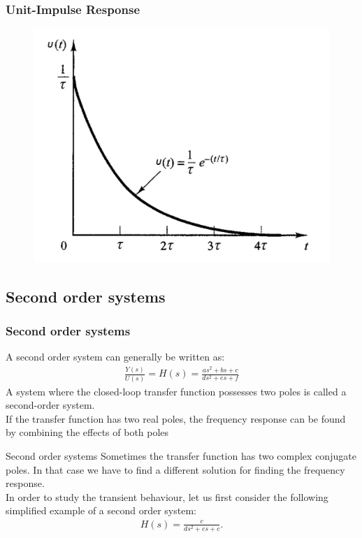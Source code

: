 \begin{frame}
\frametitle{Unit-Impulse Response}
	\begin{center}
		\begin{figure}
			\includegraphics[width=0.7\linewidth]{Afbeelding5}
		\end{figure}
	\end{center}
\end{frame}

\subsection{Second order systems} 

\begin{frame}
\frametitle{Second order systems}
A second order system can generally be written as:
\begin{align*}
\frac{Y(s)}{U(s)}=H(s)=\frac{as^2+ bs+ c}{ds^2+ es+ f}
\end{align*}
A system where the closed-loop transfer function possesses two poles is called a second-order system.\\
\vspace{1em}
If the transfer function has two real poles, the frequency response can be found by combining the effects of both poles
\end{frame}

\begin{frame}{Second order systems} 
\vspace{-0.5cm}
Sometimes the transfer function has two complex conjugate poles. In that case we have to find a different solution for finding the frequency response.\\
\vspace{1em}
In order to study the transient behaviour, let us first consider the following simplified example of a second order system:
\begin{align*}
H(s) = \frac{c}{ds^2+es+c}.
\end{align*}
\vspace{-0.5cm}
\end{frame}

